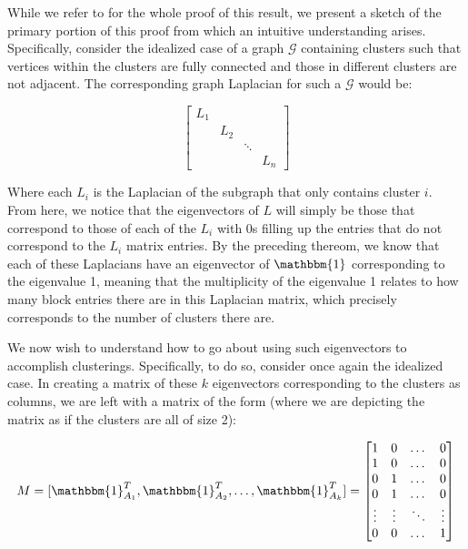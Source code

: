 \documentclass[journal]{IEEEtran}
\begin{document}
While we refer to \cite{spectral} for the whole proof of this result, we present a sketch of the primary portion of this proof from which an intuitive understanding arises. Specifically, consider the idealized case of a graph $\mathcal{G}$ containing clusters such that vertices within the clusters are fully connected and those in different clusters are not adjacent. The corresponding graph Laplacian for such a $\mathcal{G}$ would be:

\[
\begin{bmatrix}
    L_{1} &  & &  \\
    & L_{2} & &  \\
    & & \ddots &  \\
    & & & L_{n}
\end{bmatrix}
\]

Where each $L_i$ is the Laplacian of the subgraph that only contains cluster $i$. From here, we notice that the eigenvectors of $L$ will simply be those that correspond to those of each of the $L_i$ with 0s filling up the entries that do not correspond to the $L_i$ matrix entries. By the preceding thereom, we know that each of these Laplacians have an eigenvector of $\mathbbm{1}$ corresponding to the eigenvalue 1, meaning that the multiplicity of the eigenvalue 1 relates to how many block entries there are in this Laplacian matrix, which precisely corresponds to the number of clusters there are. 

We now wish to understand how to go about using such eigenvectors to accomplish clusterings. Specifically, to do so, consider once again the idealized case. In creating a matrix of these $k$ eigenvectors corresponding to the clusters as columns, we are left with a matrix of the form (where we are depicting the matrix as if the clusters are all of size 2):

$$ M = [\mathbbm{1}_{A_1}^T,\mathbbm{1}_{A_2}^T,\dots,\mathbbm{1}_{A_k}^T] = 
\begin{bmatrix}
    1 & 0 & \dots & 0 \\
    1 & 0 & \dots & 0 \\
    0 & 1 & \dots & 0 \\
    0 & 1 & \dots & 0 \\
    \vdots & \vdots & \ddots & \vdots \\
    0 & 0 & \dots & 1
\end{bmatrix}
$$
\end{document}
